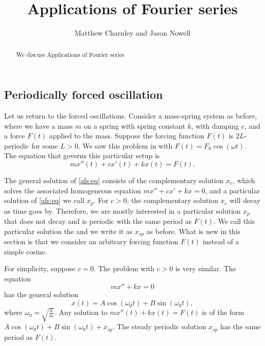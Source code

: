 \documentclass{ximera}
\title{Applications of Fourier series}
\author{Matthew Charnley and Jason Nowell}
\begin{document}
\begin{abstract}
    We discuss Applications of Fourier series
\end{abstract}
\maketitle


\label{appoffourier:section}




\subsection{Periodically forced oscillation}

\begin{mywrapfigsimp}{2.0in}{2.3in}
    \noindent
    
\end{mywrapfigsimp}
Let us return to the forced oscillations.  Consider a mass-spring system as before, where we have a mass $m$ on a spring with spring constant $k$, with damping $c$, and a force $F(t)$ applied to the mass.  Suppose the forcing function $F(t)$ is $2L$-periodic for some $L > 0$. We saw this problem in  with $F(t) = F_0 \cos (\omega t)$.  The equation that governs this particular setup is
\begin{equation} \label{afs:eq}
    mx''(t) + cx'(t) + kx(t) = F(t) .
\end{equation}

The general solution of \eqref{afs:eq} consists of the complementary solution $x_c$, which solves the associated homogeneous equation $mx'' + cx' + kx = 0$, and a particular solution of \eqref{afs:eq} we call $x_p$.  For $c > 0$, the complementary solution $x_c$ will decay as time goes by. Therefore, we are mostly interested in a particular solution $x_p$ that does not decay and is periodic with the same period as $F(t)$.  We call this particular solution the \emph{} and we write it as $x_{sp}$ as before. What is new in this section is that we consider an arbitrary forcing function $F(t)$ instead of a simple cosine.

For simplicity, suppose $c=0$.  The problem with $c > 0$ is very similar. The equation
\begin{equation*}
    mx'' + kx = 0 
\end{equation*}
has the general solution
\begin{equation*}
    x(t) = A \cos (\omega_0 t) + B \sin (\omega_0 t) ,
\end{equation*}
where $\omega_0 = \sqrt{\frac{k}{m}}$. Any solution to $mx''(t) + kx(t) = F(t)$ is of the form $A \cos (\omega_0 t) + B \sin (\omega_0 t) + x_{sp}$. The steady periodic solution $x_{sp}$ has the same period as $F(t)$.
\end{document}
